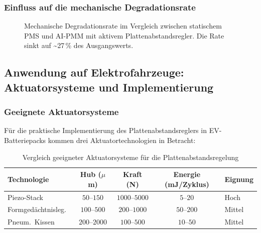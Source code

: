﻿\documentclass[12pt,a4paper]{article}
\begin{document}
\subsubsection{Einfluss auf die mechanische Degradationsrate}

\begin{figure}[H]
	\centering
	\caption{Mechanische Degradationsrate im Vergleich zwischen statischem
		PMS und AI-PMM mit aktivem Plattenabstandsregler. Die Rate sinkt
		auf \textasciitilde{}27\,\% des Ausgangswerts.}
	\label{fig:mech_deg_rate}
\end{figure}

\subsection{Anwendung auf Elektrofahrzeuge: Aktuatorsysteme und Implementierung}

\subsubsection{Geeignete Aktuatorsysteme}

Für die praktische Implementierung des Plattenabstandsreglers in EV-Batteriepacks
kommen drei Aktuatortechnologien in Betracht:

\begin{table}[H]
	\centering
	\caption{Vergleich geeigneter Aktuatorsysteme für die Plattenabstandsregelung}
	\label{tab:actuators}
	\begin{tabular}{lcccl}
		\toprule
		\textbf{Technologie} & \textbf{Hub} ($\mu$m) & \textbf{Kraft} (N) & \textbf{Energie} (mJ/Zyklus) & \textbf{Eignung} \\
		\midrule
		Piezo-Stack & $50\text{--}150$ & $1000\text{--}5000$ & $5\text{--}20$ & Hoch \\
		Formgedächtnisleg.\ & $100\text{--}500$ & $200\text{--}1000$ & $50\text{--}200$ & Mittel \\
		Pneum.\ Kissen & $200\text{--}2000$ & $100\text{--}500$ & $10\text{--}50$ & Mittel \\
		\bottomrule
	\end{tabular}
\end{table}
\end{document}

